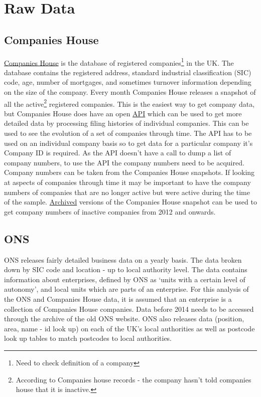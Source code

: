\documentclass[a4paper,10pt]{article}
\begin{document}
\section{Raw Data}
\subsection{Companies House}
\href{https://www.gov.uk/government/organisations/companies-house}{Companies House} is the database of registered companies\footnote{Need to check definition of a company} in the UK. The database contains the registered address, standard industrial classification (SIC) code, age, number of mortgages, and sometimes turnover information depending on the size of the company. Every month Companies House releases a snapshot of all the active\footnote{According to Companies house records - the company hasn't told companies house that it is inactive.} registered companies. This is the easiest way to get company data, but Companies House does have an open \href{https://developer.companieshouse.gov.uk/api/docs/}{API} which can be used to get more detailed data by processing filing histories of individual companies. This can be used to see the evolution of a set of companies through time. The API has to be used on an individual company basis so to get data for a particular company it's Company ID is required. As the API doesn't have a call to dump a list of company numbers, to use the API the company numbers need to be acquired. Company numbers can be taken from the Companies House snapshots. If looking at aspects of companies through time it may be important to have the company numbers of companies that are no longer active but were active during the time of the sample. \href{https://web.archive.org/web/*/http://download.companieshouse.gov.uk/en_output.html}{Archived} versions of the Companies House snapshot can be used to get company numbers of inactive companies from 2012 and onwards.
\subsection{ONS}
ONS releases fairly detailed business data on a yearly basis. The data broken down by SIC code and location - up to local authority level. The data contains information about enterprises, defined by ONS as `units with a certain level of autonomy', and local units which are parts of an enterprise. For this analysis of the ONS and Companies House data, it is assumed that an enterprise is a collection of Companies House companies. Data before 2014 needs to be accessed through the archive of the old ONS website. ONS also releases data (position, area, name - id look up) on each of the UK's local authorities as well as postcode look up tables to match postcodes to local authorities.
\end{document}
